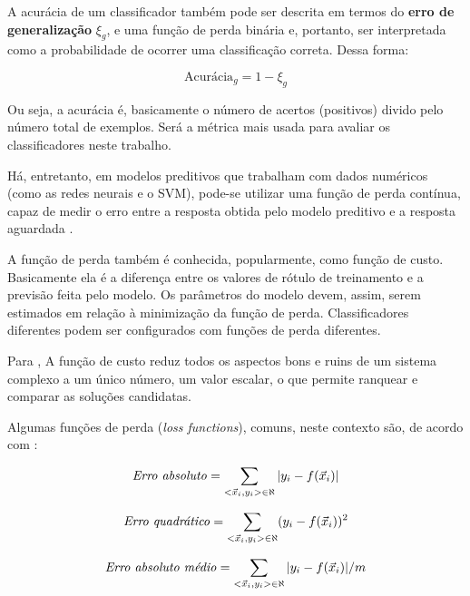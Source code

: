 A acurácia de um classificador também pode ser descrita em termos do \textbf{erro de generalização} $\xi_g$, e uma função de perda binária e, portanto, ser interpretada como a probabilidade de ocorrer uma classificação correta. Dessa forma:

\begin{equation}
\textrm{Acurácia}_g=1 - \xi_g
\end{equation}

Ou seja, a acurácia é, basicamente o número de acertos (positivos) divido pelo número total de exemplos. Será a métrica mais usada para avaliar os classificadores neste trabalho.

Há, entretanto, em modelos preditivos que trabalham com dados numéricos (como as redes neurais e o SVM), pode-se utilizar uma função de perda contínua, capaz de medir o erro entre a resposta obtida pelo modelo preditivo e a resposta aguardada \cite{Boscarioli2017} \cite{deep_learning_book_2019}.

A função de perda também é conhecida, popularmente, como função de custo. Basicamente ela é a diferença entre os valores de rótulo de treinamento e a previsão feita pelo modelo. Os parâmetros do modelo devem, assim, serem estimados em relação à minimização da função de perda. Classificadores diferentes podem ser configurados com funções de perda diferentes.  \cite{nn_smithing_1999} \cite{minewiskan_modelos_nodate} \cite{silva_redes_2016} \cite{Boscarioli2017} \cite{goldschmidt2005} \cite{geron_maos_2020} \cite{deep_learning_book_2019}

Para , A função de custo reduz todos os aspectos bons e ruins de um sistema complexo a um único número, um valor escalar, o que permite ranquear e comparar as soluções candidatas.

Algumas funções de perda (\textit{loss functions}), comuns, neste contexto são, de acordo com :

\begin{equation}\label{erro_absoluto}
	\textrm{\textit{Erro absoluto}}=\sum_{<\vec{x}_i, y_i> \in \aleph} |y_i - f(\vec{x}_i)|
\end{equation}

\begin{equation}\label{erro_quadratico}
\textrm{\textit{Erro quadrático}}=\sum_{<\vec{x}_i, y_i> \in \aleph} (y_i - f(\vec{x}_i))^2
\end{equation}

\begin{equation}\label{erro_absoluto_medio}
\textrm{\textit{Erro absoluto médio}}=\sum_{<\vec{x}_i, y_i> \in \aleph} |y_i - f(\vec{x}_i)|/m
\end{equation}

